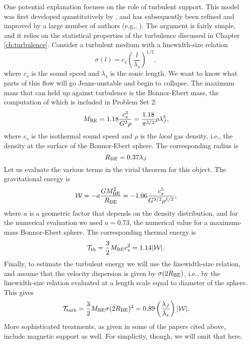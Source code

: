One potential explanation focuses on the role of turbulent support. This model was first developed quantitatively by \citet{krumholz05c}, and has subsequently been refined and improved by a large number of authors (e.g., \citealt{hennebelle11b, padoan11a, padoan14a, federrath12a}). The argument is fairly simple, and it relies on the statistical properties of the turbulence discussed in Chapter \ref{ch:turbulence}. Consider a turbulent medium with a linewidth-size relation
\begin{equation}
\sigma(l)=c_s\left(\frac{l}{\lambda_s}\right)^{1/2},
\end{equation}
where $c_s$ is the sound speed and $\lambda_s$ is the sonic length. We want to know what parts of this flow will go Jeans-unstable and begin to collapse. The maximum mass that can held up against turbulence is the Bonnor-Ebert mass, the computation of which is included in Problem Set 2:
\begin{equation}
M_{\rm BE} = 1.18 \frac{c_s^3}{G^3\rho} = \frac{1.18}{\pi^{3/2}}\rho \lambda_J^3,
\end{equation}
where $c_s$ is the isothermal sound speed and $\rho$ is the {\it local} gas density, i.e., the density at the surface of the Bonnor-Ebert sphere. The corresponding radius is
\begin{equation}
R_{\rm BE} = 0.37\lambda_J
\end{equation}
Let us evaluate the various terms in the virial theorem for this object. The gravitational energy is
\begin{equation}
\mathcal{W} = -a \frac{G M_{\rm BE}^2}{R_{\rm BE}} = -1.06 \frac{c_s^5}{G^{3/2} \rho^{1/2}},
\end{equation}
where $a$ is a geometric factor that depends on the density distribution, and for the numerical evaluation we used $a=0.73$, the numerical value for a maximum-mass Bonnor-Ebert sphere. The corresponding thermal energy is
\begin{equation}
\mathcal{T}_{\rm th} = \frac{3}{2}M_{\rm BE} c_s^2 = 1.14 |\mathcal{W}|.
\end{equation}
Finally, to estimate the turbulent energy we will use the linewidth-size relation, and assume that the velocity dispersion is given by $\sigma(2 R_{\rm BE})$, i.e., by the linewidth-size relation evaluated at a length scale equal to diameter of the sphere. This gives
\begin{equation}
\mathcal{T}_{\rm turb} = \frac{3}{2} M_{\rm BE} \sigma(2R_{\rm BE})^2 = 0.89 \left(\frac{\lambda_J}{\lambda_s}\right) |\mathcal{W}|.
\end{equation}
More sophisticated treatments, as given in some of the papers cited above, include magnetic support as well. For simplicity, though, we will omit that here.

